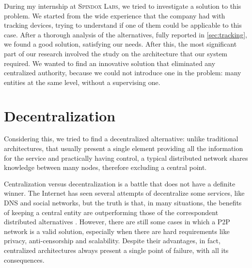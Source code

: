 During my internship at \textsc{Spindox Labs}, we tried to investigate a solution to this problem. We started from the wide experience that the company had with tracking devices, trying to understand if one of them could be applicable to this case. After a thorough analysis of the alternatives, fully reported in \ref{sec:tracking}, we found a good solution, satisfying our needs. After this, the most significant part of our research involved the study on the architecture that our system required. We wanted to find an innovative solution that eliminated any centralized authority, because we could not introduce one in the problem: many entities at the same level, without a supervising one. 

\section{Decentralization}
\label{sec:decentralization}

Considering this, we tried to find a decentralized alternative: unlike traditional architectures, that usually present a single element providing all the information for the service and practically having control, a typical distributed network shares knowledge between many nodes, therefore excluding a central point.

Centralization versus decentralization is a battle that does not have a definite winner. The Internet has seen several attempts of decentralize some services, like DNS and social networks, but the truth is that, in many situations, the benefits of keeping a central entity are outperforming those of the correspondent distributed alternatives \cite{Montresor_Permissionless}. However, there are still some cases in which a P2P network is a valid solution, especially when there are hard requirements like privacy, anti-censorship and scalability. Despite their advantages, in fact, centralized architectures always present a single point of failure, with all its consequences.

